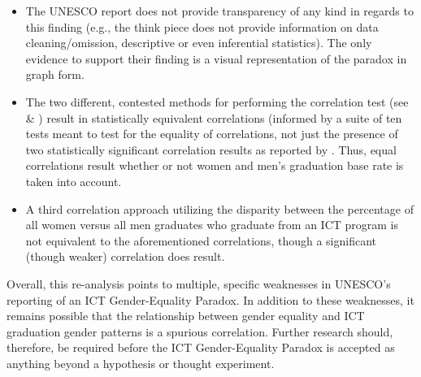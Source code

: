 \documentclass[]{book}
\providecommand{\tightlist}{%
  \setlength{\itemsep}{0pt}\setlength{\parskip}{0pt}}
\begin{document}
\begin{itemize}
\tightlist
\item
  The UNESCO report does not provide transparency of any kind in regards
  to this finding (e.g., the think piece does not provide information on
  data cleaning/omission, descriptive or even inferential statistics).
  The only evidence to support their finding is a visual representation
  of the paradox in graph form.
\item
  The two different, contested methods for performing the correlation
  test (see \citet{richardsonThereGenderEqualityParadox2020a} \&
  \citet{stoetGenderEqualityParadoxPart2020a}) result in statistically
  equivalent correlations (informed by a suite of ten tests meant to
  test for the equality of correlations, not just the presence of two
  statistically significant correlation results as reported by
  \citet{stoetGenderEqualityParadoxPart2020a}. Thus, equal correlations
  result whether or not women and men's graduation base rate is taken
  into account.
\item
  A third correlation approach utilizing the disparity between the
  percentage of all women versus all men graduates who graduate from an
  ICT program is not equivalent to the aforementioned correlations,
  though a significant (though weaker) correlation does result.
\end{itemize}

Overall, this re-analysis points to multiple, specific weaknesses in
UNESCO's reporting of an ICT Gender-Equality Paradox. In addition to
these weaknesses, it remains possible that the relationship between
gender equality and ICT graduation gender patterns is a spurious
correlation. Further research should, therefore, be required before the
ICT Gender-Equality Paradox is accepted as anything beyond a hypothesis
or thought experiment.


\end{document}
